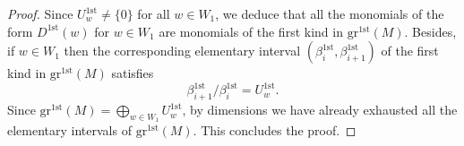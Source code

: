 \documentclass[10pt,a4paper]{amsart}
\begin{document}
\begin{proof}
    Since $U^{1\mathrm{st}}_{w} \not = \{0\}$ for all $w \in W_1$, we deduce that all the monomials of the form $D^{1\mathrm{st}}(w)$ for $w \in W_1$ are monomials of the first kind in $\mathrm{gr}^{1\mathrm{st}}(M)$. Besides, if $w \in W_1$ then the corresponding elementary interval $(\beta_i^{1\mathrm{st}}, \beta_{i+1}^{1\mathrm{st}})$ of the first kind in $\mathrm{gr}^{1\mathrm{st}}(M)$ satisfies 
    \begin{equation*}
        \beta_{i+1}^{1\mathrm{st}}/\beta_i^{1\mathrm{st}} = U^{1\mathrm{st}}_{w}.
    \end{equation*}
    Since $\mathrm{gr}^{1\mathrm{st}}(M) = \bigoplus_{w \in W_1} U^{1\mathrm{st}}_{w}$, by dimensions we have already exhausted all the elementary intervals of $\mathrm{gr}^{1\mathrm{st}}(M)$. This concludes the proof.
\end{proof}
\end{document}
